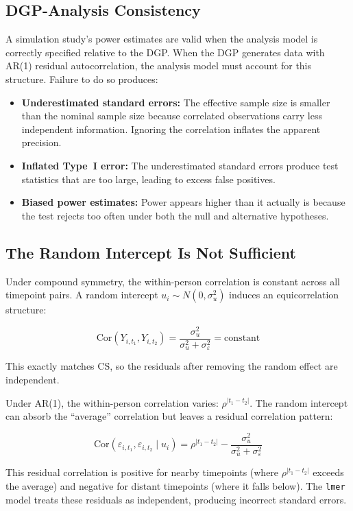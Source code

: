 \documentclass[11pt]{article}
\begin{document}
\subsection{DGP-Analysis Consistency}

A simulation study's power estimates are valid when the
analysis model is correctly specified relative to the DGP.
When the DGP generates data with AR(1) residual
autocorrelation, the analysis model must account for this
structure. Failure to do so produces:

\begin{itemize}
\item \textbf{Underestimated standard errors:} The effective
  sample size is smaller than the nominal sample size because
  correlated observations carry less independent information.
  Ignoring the correlation inflates the apparent precision.
\item \textbf{Inflated Type~I error:} The underestimated
  standard errors produce test statistics that are too large,
  leading to excess false positives.
\item \textbf{Biased power estimates:} Power appears higher
  than it actually is because the test rejects too often
  under both the null and alternative hypotheses.
\end{itemize}

\subsection{The Random Intercept Is Not Sufficient}

Under compound symmetry, the within-person correlation is
constant across all timepoint pairs. A random intercept
$u_i \sim N(0, \sigma_u^2)$ induces an equicorrelation
structure:

\[
\text{Cor}(Y_{i,t_1}, Y_{i,t_2}) =
\frac{\sigma_u^2}{\sigma_u^2 + \sigma_\varepsilon^2}
= \text{constant}
\]

This exactly matches CS, so the residuals after removing the
random effect are independent.

Under AR(1), the within-person correlation varies:
$\rho^{|t_1 - t_2|}$. The random intercept can absorb the
``average'' correlation but leaves a residual correlation
pattern:

\[
\text{Cor}(\varepsilon_{i,t_1}, \varepsilon_{i,t_2} \mid u_i) =
\rho^{|t_1 - t_2|} - \frac{\sigma_u^2}{\sigma_u^2 +
\sigma_\varepsilon^2}
\]

This residual correlation is positive for nearby timepoints
(where $\rho^{|t_1 - t_2|}$ exceeds the average) and negative
for distant timepoints (where it falls below). The
\texttt{lmer} model treats these residuals as independent,
producing incorrect standard errors.
\end{document}

